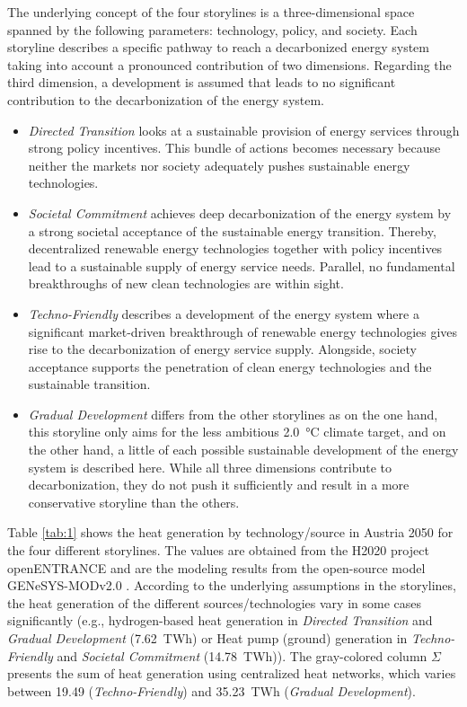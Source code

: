 The underlying concept of the four storylines is a three-dimensional space spanned by the following parameters: technology, policy, and society. Each storyline describes a specific pathway to reach a decarbonized energy system taking into account a pronounced contribution of two dimensions. Regarding the third dimension, a development is assumed that leads to no significant contribution to the decarbonization of the energy system. 

\begin{itemize}
	\item \textit{Directed Transition} looks at a sustainable provision of energy services through strong policy incentives. This bundle of actions becomes necessary because neither the markets nor society adequately pushes sustainable energy technologies.
	\item \textit{Societal Commitment} achieves deep decarbonization of the energy system by a strong societal acceptance of the sustainable energy transition. Thereby, decentralized renewable energy technologies together with policy incentives lead to a sustainable supply of energy service needs. Parallel, no fundamental breakthroughs of new clean technologies are within sight.
	\item \textit{Techno-Friendly} describes a development of the energy system where a significant market-driven breakthrough of renewable energy technologies gives rise to the decarbonization of energy service supply. Alongside, society acceptance supports the penetration of clean energy technologies and the sustainable transition.
	\item \textit{Gradual Development} differs from the other storylines as on the one hand, this storyline only aims for the less ambitious \SI{2.0}{\degreeCelsius} climate target, and on the other hand, a little of each possible sustainable development of the energy system is described here. While all three dimensions contribute to decarbonization, they do not push it sufficiently and result in a more conservative storyline than the others.
\end{itemize}

Table \ref{tab:1} shows the heat generation by technology/source in Austria 2050 for the four different storylines. The values are obtained from the H2020 project openENTRANCE and are the modeling results from the open-source model GENeSYS-MODv2.0 \cite{burandt2018genesys}. According to the underlying assumptions in the storylines, the heat generation of the different sources/technologies vary in some cases significantly (e.g., hydrogen-based heat generation in \textit{Directed Transition} and \textit{Gradual Development} (\SI{7.62}{TWh}) or Heat pump (ground) generation in \textit{Techno-Friendly} and \textit{Societal Commitment} (\SI{14.78}{TWh})). The gray-colored column $\Sigma$ presents the sum of heat generation using centralized heat networks, which varies between \SI{19.49}{} (\textit{Techno-Friendly}) and \SI{35.23}{TWh} (\textit{Gradual Development}).

